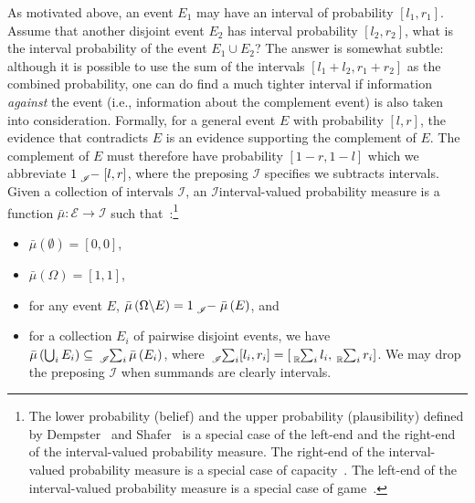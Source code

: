 \documentclass{article}
\theoremstyle{remark}
\newcommand{\events}{\ensuremath{\mathcal{E}}}
\newcommand{\necess}{{\mbox{\wesa{certain}}}}
\begin{document}
As motivated above, an event $E_{1}$ may have an interval of probability
$[l_{1},r_{1}]$. Assume that another disjoint event $E_{2}$ has
interval probability $[l_{2},r_{2}]$, what is the interval probability
of the event $E_{1}\cup E_{2}$? The answer is somewhat subtle: although
it is possible to use the sum of the intervals $[l_{1}+l_{2},r_{1}+r_{2}]$
as the combined probability, one can do find a much tighter interval
if information \emph{against} the event (i.e., information about the
complement event) is also taken into consideration. Formally, for
a general event $E$ with probability $[l,r]$, the evidence that
contradicts $E$ is an evidence supporting the complement of $E$.
The complement of $E$ must therefore have probability $\left[1-r,1-l\right]$
which we abbreviate $1\tensor*[_{\mathscr{I}}]{-}{}\left[l,r\right]$,
where the preposing $\mathscr{I}$ specifies we subtracts intervals.
Given a collection of intervals $\mathscr{I}$, an $\mathscr{I}$\textendash interval-valued
probability measure is a function $\bar{\mu}:\events\rightarrow\mathscr{I}$
such that~\cite{JamisonLodwick2004}:\footnote{The lower probability (belief) and the upper probability (plausibility)
defined by Dempster~\cite{Dempster1967} and Shafer~\cite{Shafer1976}
is a special case of the left-end and the right-end of the interval-valued
probability measure. The right-end of the interval-valued probability
measure is a special case of capacity~\cite{Choquet1954,Graf1980,Goodman2013}.
The left-end of the interval-valued probability measure is a special
case of game~\cite{Shapley1965}.} 
\begin{itemize}
\item $\bar{\mu}(\emptyset)=[0,0]$, 
\item $\bar{\mu}(\Omega)=[1,1]$, 
\item for any event $E$, $\bar{\mu}\left(\Omega\backslash
E\right)=1\tensor*[_{\mathscr{I}}]{-}{}\bar{\mu}\left(E\right)$, and 
\item for a collection $E_{i}$ of pairwise disjoint events, we have $\bar{\mu}\left(\bigcup_{i}E_{i}\right)\subseteq\tensor*[_{\mathscr{I}}]{\sum}{_{i}}\bar{\mu}\left(E_{i}\right)$,
where $\tensor*[_{\mathscr{I}}]{\sum}{_{i}}[l_{i},r_{i}]=\left[\tensor*[_{\mathbb{R}}]{\sum}{_{i}}l_{i},\tensor*[_{\mathbb{R}}]{\sum}{_{i}}r_{i}\right]$.
We may drop the preposing $\mathscr{I}$ when summands are clearly intervals. 
\end{itemize}

\end{document}
